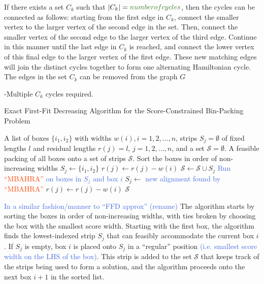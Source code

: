 \documentclass[oribibl]{llncs}
\begin{document}
If there exists a set $C_k$ such that $|C_k| = \textcolor{OliveGreen}{number of cycles}$, then the cycles can be connected as follows: starting from the first edge in $C_k$, connect the smaller vertex to the larger vertex of the second edge in the set. Then, connect the smaller vertex of the second edge to the larger vertex of the third edge. Continue in this manner until the last edge in $C_k$ is reached, and connect the lower vertex of this final edge to the larger vertex of the first edge. These new matching edges will join the distinct cycles together to form one alternating Hamiltonian cycle. The edges in the set $C_k$ can be removed from the graph $G$

-Multiple $C_k$ cycles required.
 













\begin{algorithm}[H]
	\caption{\textcolor{OliveGreen}{Exact First-Fit Decreasing Algorithm for the Score-Constrained Bin-Packing Problem}}
	\begin{algorithmic}[1]
	\Require A list of boxes $\{i_1, i_2\}$ with widths $w(i), i = 1, 2, ..., n$, strips $S_j = \emptyset$ of fixed lengths $l$ and residual lengths $r(j) = l$, $j = 1, 2, ...,n$, and a set $\mathcal{S} = \emptyset$.
	\Ensure A feasible packing of all boxes onto a set of strips $\mathcal{S}$.	
	\State Sort the boxes in order of non-increasing widths
				\State $S_j \gets \{i_1, i_2\}$
				\State $r(j) \gets r(j) - w(i)$
				\State $\mathcal{S} \gets \mathcal{S} \cup S_j$
				\Break
				\State \textcolor{RoyalBlue}{Run} \textcolor{OrangeRed}{``MBAHRA''} \textcolor{RoyalBlue}{on boxes in $S_j$ and box $i$}
					\State $S_j \gets$ \textcolor{RoyalBlue}{new alignment found by} \textcolor{OrangeRed}{``MBAHRA''}
					\State $r(j) \gets r(j) - w(i)$
					\Break
				\EndIf
			\EndIf
		\EndFor
	\EndFor
	\Return $\mathcal{S}$
	\end{algorithmic}	
\end{algorithm}

\textcolor{RoyalBlue}{In a similar fashion/manner to ``FFD approx'' (rename)} The algorithm starts by sorting the boxes in order of non-increasing widths, with ties broken by choosing the box with the smallest score width. Starting with the first box, the algorithm finds the lowest-indexed strip $S_j$ that can feasibly accommodate the current box $i$. If $S_j$ is empty, box $i$ is placed onto $S_j$ in a ``regular'' position \textcolor{RoyalBlue}{(i.e. smallest score width on the LHS of the box)}. This strip is added to the set $\mathcal{S}$ that keeps track of the strips being used to form a solution, and the algorithm proceeds onto the next box $i+1$ in the sorted list.
\end{document}
